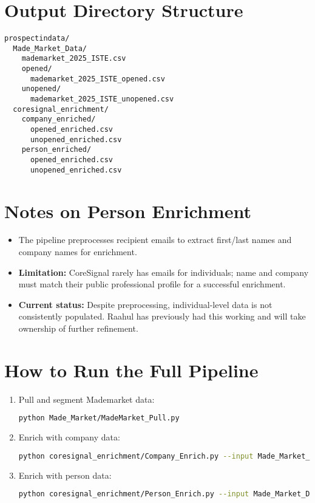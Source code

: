 \documentclass{article}
\begin{document}
\section{Output Directory Structure}
\begin{verbatim}
prospectindata/
  Made_Market_Data/
    mademarket_2025_ISTE.csv
    opened/
      mademarket_2025_ISTE_opened.csv
    unopened/
      mademarket_2025_ISTE_unopened.csv
  coresignal_enrichment/
    company_enriched/
      opened_enriched.csv
      unopened_enriched.csv
    person_enriched/
      opened_enriched.csv
      unopened_enriched.csv
\end{verbatim}

\section{Notes on Person Enrichment}
\begin{itemize}
  \item The pipeline preprocesses recipient emails to extract first/last names and company names for enrichment.
  \item \textbf{Limitation:} CoreSignal rarely has emails for individuals; name and company must match their public professional profile for a successful enrichment.
  \item \textbf{Current status:} Despite preprocessing, individual-level data is not consistently populated. Raahul has previously had this working and will take ownership of further refinement.
\end{itemize}

\section{How to Run the Full Pipeline}
\begin{enumerate}
  \item Pull and segment Mademarket data:
\begin{lstlisting}[language=bash]
python Made_Market/MadeMarket_Pull.py
\end{lstlisting}
  \item Enrich with company data:
\begin{lstlisting}[language=bash]
python coresignal_enrichment/Company_Enrich.py --input Made_Market_Data/opened/mademarket_2025_ISTE_opened.csv --output coresignal_enrichment/company_enriched/opened_enriched.csv
\end{lstlisting}
  \item Enrich with person data:
\begin{lstlisting}[language=bash]
python coresignal_enrichment/Person_Enrich.py --input Made_Market_Data/opened/mademarket_2025_ISTE_opened.csv --output coresignal_enrichment/person_enriched/opened_enriched.csv
\end{lstlisting}
\end{enumerate}
\end{document}
